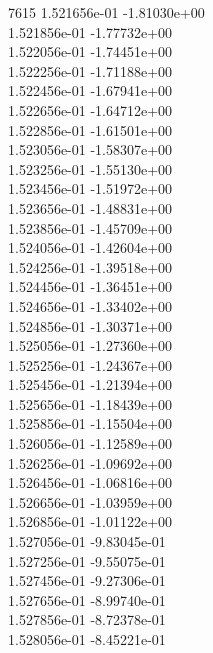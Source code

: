 7615	1.521656e-01	-1.81030e+00	\\ 	1.521856e-01	-1.77732e+00	\\ 	1.522056e-01	-1.74451e+00	\\ 	1.522256e-01	-1.71188e+00	\\ 	1.522456e-01	-1.67941e+00	\\ 	1.522656e-01	-1.64712e+00	\\ 	1.522856e-01	-1.61501e+00	\\ 	1.523056e-01	-1.58307e+00	\\ 	1.523256e-01	-1.55130e+00	\\ 	1.523456e-01	-1.51972e+00	\\ 	1.523656e-01	-1.48831e+00	\\ 	1.523856e-01	-1.45709e+00	\\ 	1.524056e-01	-1.42604e+00	\\ 	1.524256e-01	-1.39518e+00	\\ 	1.524456e-01	-1.36451e+00	\\ 	1.524656e-01	-1.33402e+00	\\ 	1.524856e-01	-1.30371e+00	\\ 	1.525056e-01	-1.27360e+00	\\ 	1.525256e-01	-1.24367e+00	\\ 	1.525456e-01	-1.21394e+00	\\ 	1.525656e-01	-1.18439e+00	\\ 	1.525856e-01	-1.15504e+00	\\ 	1.526056e-01	-1.12589e+00	\\ 	1.526256e-01	-1.09692e+00	\\ 	1.526456e-01	-1.06816e+00	\\ 	1.526656e-01	-1.03959e+00	\\ 	1.526856e-01	-1.01122e+00	\\ 	1.527056e-01	-9.83045e-01	\\ 	1.527256e-01	-9.55075e-01	\\ 	1.527456e-01	-9.27306e-01	\\ 	1.527656e-01	-8.99740e-01	\\ 	1.527856e-01	-8.72378e-01	\\ 	1.528056e-01	-8.45221e-01	\\ \hline
